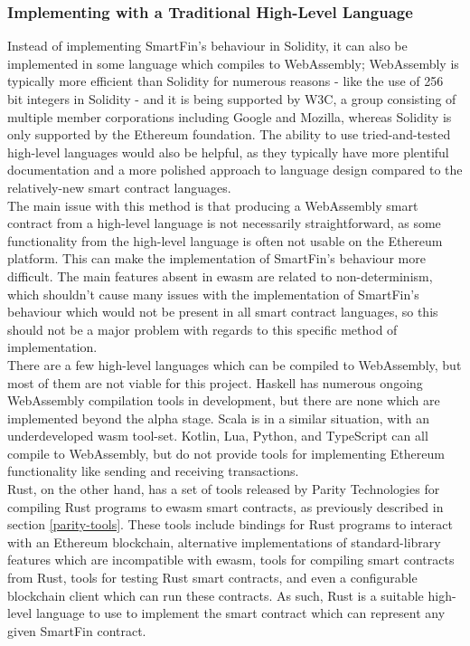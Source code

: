 \subsubsection{Implementing with a Traditional High-Level Language}

Instead of implementing SmartFin's behaviour in Solidity, it can also be implemented in some language which compiles to WebAssembly\cite{EWASMDOC}; WebAssembly is typically more efficient than Solidity for numerous reasons - like the use of 256 bit integers in Solidity\cite{FASEVM} - and it is being supported by W3C, a group consisting of multiple member corporations including Google and Mozilla\cite{W3CMEM}, whereas Solidity is only supported by the Ethereum foundation. The ability to use tried-and-tested high-level languages would also be helpful, as they typically have more plentiful documentation and a more polished approach to language design compared to the relatively-new smart contract languages. \\

The main issue with this method is that producing a WebAssembly smart contract from a high-level language is not necessarily straightforward, as some functionality from the high-level language is often not usable on the Ethereum platform. This can make the implementation of SmartFin's behaviour more difficult. The main features absent in ewasm are related to non-determinism\cite{EWASMDOC}, which shouldn't cause many issues with the implementation of SmartFin's behaviour which would not be present in all smart contract languages, so this should not be a major problem with regards to this specific method of implementation. \\

There are a few high-level languages which can be compiled to WebAssembly, but most of them are not viable for this project. Haskell has numerous ongoing WebAssembly compilation tools in development, but there are none which are implemented beyond the alpha stage\cite{DHC}\cite{ASTR}. Scala is in a similar situation, with an underdeveloped wasm tool-set\cite{SCWASM}. Kotlin, Lua, Python, and TypeScript can all compile to WebAssembly, but do not provide tools for implementing Ethereum functionality like sending and receiving transactions\cite{AWASM}. \\

Rust\cite{rust}, on the other hand, has a set of tools released by Parity Technologies for compiling Rust programs to ewasm smart contracts\cite{PWASM}, as previously described in section \ref{parity-tools}. These tools include bindings for Rust programs to interact with an Ethereum blockchain, alternative implementations of standard-library features which are incompatible with ewasm, tools for compiling smart contracts from Rust, tools for testing Rust smart contracts, and even a configurable blockchain client which can run these contracts. As such, Rust is a suitable high-level language to use to implement the smart contract which can represent any given SmartFin contract.


